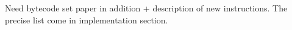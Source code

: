 \documentclass[a4paper,12pt,twoside]{../includes/ThesisStyle}
\begin{document}

Need bytecode set paper in addition + description of new instructions. The precise list come in implementation section.


\ifx\wholebook\relax\else
    
\end{document}
